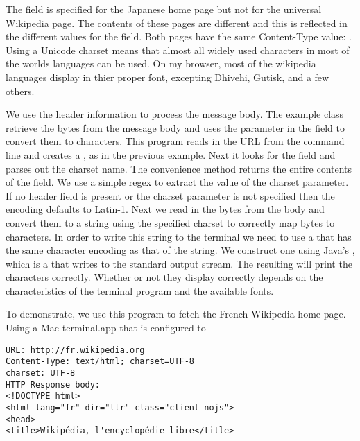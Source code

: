 %
The field  is specified for the Japanese home page
but not for the universal Wikipedia page.  The contents of these pages are different
and this is reflected in the different values for the  field.
Both pages have the same Content-Type value: .
Using a Unicode charset means that almost all widely used characters in most of the
worlds languages can be used.
On my browser, most of the wikipedia languages display in thier proper font, excepting
Dhivehi, Gutisk, and a few others.

We use the header information to process the message body.
The example class  retrieve the bytes from the message body and
uses the  parameter in the  field to convert them
to characters.  
%
%
This program reads in the URL from the command line and creates a ,
as in the previous example.  Next it looks for the  field and
parses out the charset name.
%
%
The convenience method  returns the entire contents
of the  field.
We use a simple regex to extract the value of the charset parameter.
If no header field is present or the charset parameter is not specified
then the encoding defaults to Latin-1.
%
%
Next we read in the bytes from the body and convert them to a string
using the specified charset to correctly map bytes to characters.
%
%
In order to write this string to the terminal we need to use a 
that has the same character encoding as that of the string.
We construct one using Java's , which is a 
that writes to the standard output stream.
The resulting  will print the characters correctly.
Whether or not they display correctly depends on the characteristics of the terminal program
and the available fonts.

To demonstrate, we use this program to fetch the French Wikipedia home page.
Using a Mac terminal.app that is configured to 






\begin{verbatim}
URL: http://fr.wikipedia.org
Content-Type: text/html; charset=UTF-8
charset: UTF-8
HTTP Response body:
<!DOCTYPE html>
<html lang="fr" dir="ltr" class="client-nojs">
<head>
<title>Wikipédia, l'encyclopédie libre</title>
\end{verbatim}







